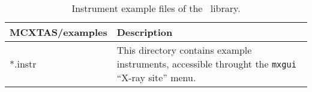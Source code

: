 \begin{table}
  \begin{center}
    {\let\my=\\
    \begin{tabular}{|p{}|p{}|}
      \hline
       {\bfseries MCXTAS/examples} & Description \\
      \hline
      *.instr & This directory contains example instruments, accessible throught the \verb+mxgui+ ``X-ray site'' menu. \\
      \hline
    \end{tabular}
    \caption{Instrument example files of the \MCX\ library.}
    \label{t:comp-instr}
    }
  \end{center}
\end{table}

